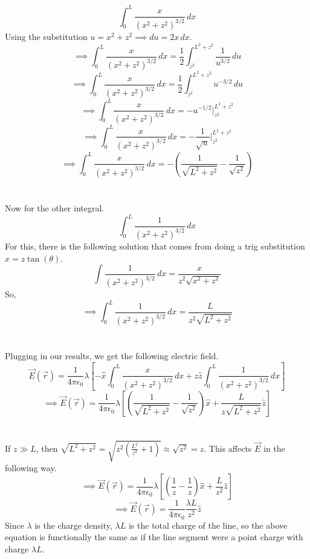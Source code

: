 \documentclass[12pt]{article}
\begin{document}
\begin{flushleft}
$$\int_0^L\frac{x}{(x^2+z^2)^{3/2}}\,dx$$
Using the substitution $u=x^2+z^2\implies du=2x\,dx$.
$$\implies\int_0^L\frac{x}{(x^2+z^2)^{3/2}}\,dx=\frac{1}{2}\int_{z^2}^{L^2+z^2}\frac{1}{u^{3/2}}\,du$$
$$\implies\int_0^L\frac{x}{(x^2+z^2)^{3/2}}\,dx=\frac{1}{2}\int_{z^2}^{L^2+z^2}u^{-3/2}\,du$$
$$\implies\int_0^L\frac{x}{(x^2+z^2)^{3/2}}\,dx=-u^{-1/2}\Big|_{z^2}^{L^2+z^2}$$
$$\implies\int_0^L\frac{x}{(x^2+z^2)^{3/2}}\,dx=-\frac{1}{\sqrt{u}}\Big|_{z^2}^{L^2+z^2}$$
$$\implies\int_0^L\frac{x}{(x^2+z^2)^{3/2}}\,dx=-\left(\frac{1}{\sqrt{L^2+z^2}}-\frac{1}{\sqrt{z^2}}\right)$$\\~\\

Now for the other integral.
$$\int_0^L\frac{1}{(x^2+z^2)^{3/2}}\,dx$$
For this, there is the following solution that comes from doing a trig substitution $x=z\tan(\theta)$.
$$\int\frac{1}{(x^2+z^2)^{3/2}}\,dx=\frac{x}{z^2\sqrt{x^2+z^2}}$$
So,
$$\implies\int_0^L\frac{1}{(x^2+z^2)^{3/2}}\,dx=\frac{L}{z^2\sqrt{L^2+z^2}}$$\\~\\

Plugging in our results, we get the following electric field.
$$\vec{E}(\vec{r})=\frac{1}{4\pi\epsilon_0}\lambda\left[-\hat{x}\int_0^L\frac{x}{(x^2+z^2)^{3/2}}\,dx+z\hat{z}\int_0^L\frac{1}{(x^2+z^2)^{3/2}}\,dx\right]$$
$$\implies\vec{E}(\vec{r})=\frac{1}{4\pi\epsilon_0}\lambda\left[\left(\frac{1}{\sqrt{L^2+z^2}}-\frac{1}{\sqrt{z^2}}\right)\hat{x}+\frac{L}{z\sqrt{L^2+z^2}}\hat{z}\right]$$\\~\\

If $z\gg L$, then $\sqrt{L^2+z^2}=\sqrt{z^2(\frac{L^2}{z^2}+1)}\approx\sqrt{z^2}=z$.
This affects $\vec{E}$ in the following way.
$$\implies\vec{E}(\vec{r})=\frac{1}{4\pi\epsilon_0}\lambda\left[\left(\frac{1}{z}-\frac{1}{z}\right)\hat{x}+\frac{L}{z^2}\hat{z}\right]$$
$$\implies\vec{E}(\vec{r})=\frac{1}{4\pi\epsilon_0}\frac{\lambda L}{z^2}\hat{z}$$
Since $\lambda$ is the charge density, $\lambda L$ is the total charge of the line, so the above equation is functionally the same as if the line segment were a point charge with charge $\lambda L$.


\end{flushleft}
\end{document}
